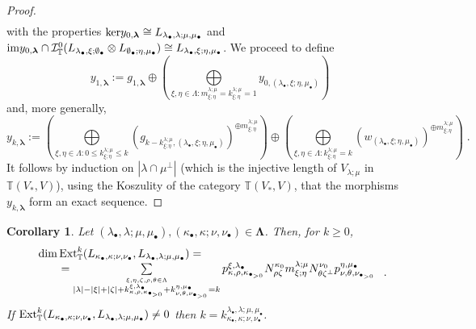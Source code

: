\documentclass[12pt]{article}
\def\TT {{\mathbb T}}     %
\def\mc {\mathcal}
\newtheorem{coro}[theorem]{Corollary}
\begin{document}
\begin{proof}
\begin{gather}
\end{gather}
with the properties ${\rm ker}y_{0,\bm\lambda}\cong L_{\lambda_\bullet,\lambda;\mu,\mu_\bullet}$ and ${\rm im}y_{0,\bm\lambda} \cap \mc I^0_{\TT}(L_{\lambda_\bullet,\xi;\emptyset_\bullet} \otimes L_{\emptyset_\bullet;\eta,\mu_\bullet}) \cong L_{\lambda_\bullet,\xi;\eta,\mu_\bullet}$. We proceed to define
$$
y_{1,\bm\lambda}:=g_{1,\bm\lambda} \oplus (\bigoplus\limits_{\xi,\eta\in\Lambda:m^{\lambda;\mu}_{\xi;\eta}=k^{\lambda;\mu}_{\xi;\eta}=1} y_{0,(\lambda_\bullet,\xi;\eta,\mu_\bullet)})
$$
and, more generally,
$$
y_{k,\bm\lambda}:= (\bigoplus\limits_{\xi,\eta\in\Lambda:0\leq k^{\lambda;\mu}_{\xi;\eta}\leq k} (g_{k-k^{\lambda;\mu}_{\xi;\eta},(\lambda_\bullet,\xi;\eta,\mu_\bullet)})^{\oplus m^{\lambda;\mu}_{\xi;\eta}}) \oplus (\bigoplus\limits_{\xi,\eta\in\Lambda:k^{\lambda;\mu}_{\xi;\eta}=k} (w_{(\lambda_\bullet,\xi;\eta,\mu_\bullet)})^{\oplus m^{\lambda;\mu}_{\xi;\eta}}) \;.
$$
It follows by induction on $|\lambda\cap\mu^\perp|$ (which is the injective length of $V_{\lambda;\mu}$ in $\TT(V_*,V)$), using the Koszulity of the category $\TT(V_*,V)$, that the morphisms $y_{k,\bm\lambda}$ form an exact sequence.
\end{proof}

\begin{coro}\label{Cor dimExt in TT}
Let $(\lambda_\bullet,\lambda;\mu,\mu_\bullet),(\kappa_\bullet,\kappa;\nu,\nu_\bullet)\in\bm\Lambda$. Then, for $k\geq 0$,
\begin{gather*}
\begin{array}{l}
\dim{\rm Ext}_{\TT}^k(L_{\kappa_\bullet,\kappa;\nu,\nu_\bullet},L_{\lambda_\bullet,\lambda;\mu,\mu_\bullet}) =\\ \qquad = \sum\limits_{\stackrel{\xi,\eta,\zeta,\rho,\theta\in\Lambda}{|\lambda|-|\xi|+|\zeta|+k^{\xi,\lambda_{\bullet}}_{\kappa,\rho,\kappa_{\bullet_{>0}}}+k^{\eta,\mu_\bullet}_{\nu,\theta,\nu_{\bullet_{>0}}} = k}}  p^{\xi,\lambda_{\bullet}}_{\kappa,\rho,\kappa_{\bullet_{>0}}} N^{\kappa_0}_{\rho\zeta} m^{\lambda;\mu}_{\xi;\eta} N^{\nu_0}_{\theta\zeta^\perp} p^{\eta,\mu_\bullet}_{\nu,\theta,\nu_{\bullet_{>0}}}\end{array}\;.
\end{gather*}
If ${\rm Ext}_{\TT}^k(L_{\kappa_\bullet,\kappa;\nu,\nu_\bullet},L_{\lambda_\bullet,\lambda;\mu,\mu_\bullet})\ne0$ then $k=k^{\lambda_\bullet,\lambda;\mu,\mu_\bullet}_{\kappa_\bullet,\kappa;\nu,\nu_\bullet}$.
\end{coro}
\end{document}
